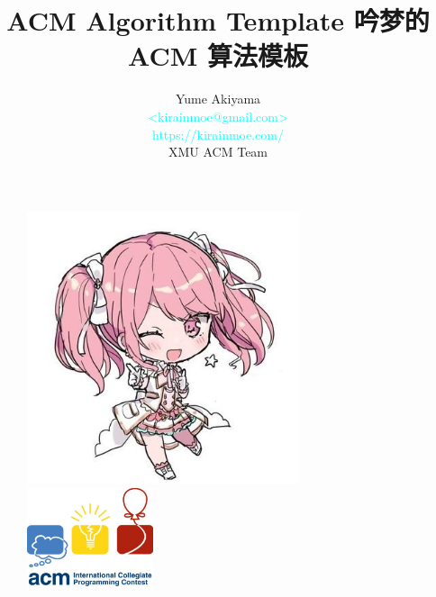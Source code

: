 \documentclass[12pt]{report}
\title{\Huge \textbf{ACM Algorithm Template} \linebreak \linebreak \large \textcolor{primary-blue}{\textbf{吟梦的 ACM 算法模板}}}
\author{Yume Akiyama \\ \small \textcolor{cyan}{<kirainmoe@gmail.com>} \\ \small \textcolor{cyan}{https://kirainmoe.com/} \\ \small XMU ACM Team}
\begin{document}
\begin{titlepage}
    \begin{figure}
        \centering
        \includegraphics[height=8cm]{images/avatar.jpg}
        \par\includegraphics[height=3cm]{images/acm.jpg}
    \end{figure}
    
    \maketitle
\end{titlepage}

\clearpage
\phantom{s}
\setcounter{page}{0}
\thispagestyle{empty}
\clearpage

\tableofcontents


























 
\end{document}
